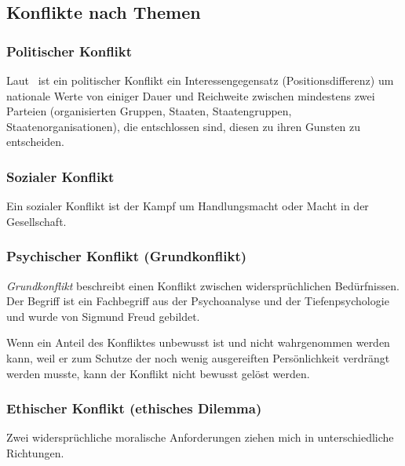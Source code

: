 \subsection{Konflikte nach Themen}

\subsubsection{Politischer Konflikt}

Laut~\cite{konfliktbarometer-2003} ist ein politischer Konflikt ein \glqq Interessengegensatz (Positionsdifferenz) um nationale Werte von einiger Dauer und Reichweite zwischen mindestens zwei Parteien (organisierten Gruppen, Staaten, Staatengruppen, Staatenorganisationen), die entschlossen sind, diesen zu ihren Gunsten zu entscheiden.\grqq

\subsubsection{Sozialer Konflikt}

Ein sozialer Konflikt ist der Kampf um Handlungsmacht oder Macht in der Gesellschaft.

\subsubsection{Psychischer Konflikt (Grundkonflikt)}

\emph{Grundkonflikt} beschreibt einen Konflikt zwischen widersprüchlichen Bedürfnissen. Der Begriff ist ein Fachbegriff aus der Psychoanalyse und der Tiefenpsychologie und wurde von Sigmund Freud gebildet.

Wenn ein Anteil des Konfliktes unbewusst ist und nicht wahrgenommen werden kann, weil er zum Schutze der noch wenig ausgereiften Persönlichkeit verdrängt werden musste, kann der Konflikt nicht bewusst gelöst werden.

\subsubsection{Ethischer Konflikt (ethisches Dilemma)}

Zwei widersprüchliche moralische Anforderungen ziehen mich in unterschiedliche Richtungen.

